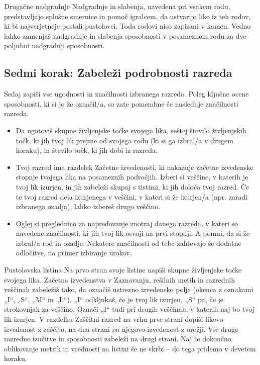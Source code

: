 \begin{rpg-titlebox}{Drugačne nadgradnje}
    Nadgradnje in slabenja, navedena pri vsakem rodu, predstavljajo splošne smernice in pomoč igralcem, da ustvarijo like iz teh rodov, ki bi najverjetneje postali pustolovci. Toda rodovi niso zapisani v kamen. Vedno lahko zamenjaš nadgradnje in slabenja sposobnosti v posameznem rodu za dve poljubni nadgradnji sposobnosti.
\end{rpg-titlebox}

\subsection{Sedmi korak: Zabeleži podrobnosti razreda}
Sedaj zapiši vse ugodnosti in značilnosti izbranega razreda. Poleg ključne ocene sposobnosti, ki si jo že označil/a, so zate pomembne še naslednje značilnosti razreda.

\begin{itemize}
    \item Da ugotoviš skupne življenjske točke svojega lika, seštej število življenjskih točk, ki jih tvoj lik prejme od svojega rodu (ki si ga izbral/a v drugem koraku), in število točk, ki jih dobi iz razreda.
    \item Tvoj razred ima razdelek Začetne izvedenosti, ki nakazuje začetne izvedenske stopnje tvojega lika na posameznih področjih. Izberi si veščine, v katerih je tvoj lik izurjen, in jih zabeleži skupaj s tistimi, ki jih določa tvoj razred. Če te tvoj razred dela izurjenega v veščini, v kateri si že izurjen/a (npr. zaradi izbranega ozadja), lahko izbereš drugo veščino.
    \item Oglej si preglednico za napredovanje znotraj danega razreda, v kateri so navedene značilnosti, ki jih tvoj lik osvoji na prvi stopnji. A pomni, da si že izbral/a rod in ozadje. Nekatere značilnosti od tebe zahtevajo še dodatne odločitve, na primer izbiranje urokov.
\end{itemize}

\begin{rpg-titlebox}{Pustolovska listina}
    Na prvo stran svoje listine napiši skupne življenjske točke svojega lika. Začetna izvedenstva v Zaznavanju, rešilnih metih in razrednih veščinah zabeležiš tako, da označiš ustrezno izvedensko polje (okenca z oznakami „I“, „S“, „M“ in „L“). „I“ odkljukaš, če je tvoj lik izurjen, „S“ pa, če je strokovnjak za veščino. Označi „I“ tudi pri drugih veščinah, v katerih naj bo tvoj lik izurjen. V razdelku Zaščitni razred na vrhu prve strani dopiši likovo izvedenost z zaščito, na dnu strani pa njegovo izvedenost z orožji. Vse druge razredne izučitve in sposobnosti zabeleži na drugi strani. Naj te dokončno oblikovanje metrik in vrednosti na listini še ne skrbi -- do tega pridemo v devetem koraku.
\end{rpg-titlebox}

